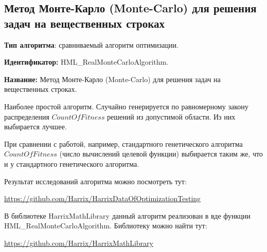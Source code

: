 \subsection{Метод Монте-Карло (Monte-Carlo) для решения задач на вещественных строках}\label{HarrixOptimizationAlgorithms:HML_RealMonteCarloAlgorithm}

\textbf{Тип алгоритма}: сравниваемый алгоритм оптимизации.

\textbf{Идентификатор:} HML\_RealMonteCarloAlgorithm.

\textbf{Название:} Метод Монте-Карло (Monte-Carlo) для решения задач на вещественных строках.

Наиболее простой алгоритм. Случайно генерируется по равномерному закону распределения $ CountOfFitness $ решений из допустимой области. Из них выбирается лучшее.

При сравнении с работой, например, стандартного генетического алгоритма $ CountOfFitness $ (число вычислений целевой функции) выбирается таким же, что и у стандартного генетического алгоритма.

Результат исследований алгоритма можно посмотреть тут:

\href{https://github.com/Harrix/HarrixDataOfOptimizationTesting}{https://github.com/Harrix/HarrixDataOfOptimizationTesting}

В библиотеке HarrixMathLibrary данный алгоритм реализован в вде функции HML\_RealMonteCarloAlgorithm. Библиотеку можно найти тут:

\href{https://github.com/Harrix/HarrixMathLibrary}{https://github.com/Harrix/HarrixMathLibrary}